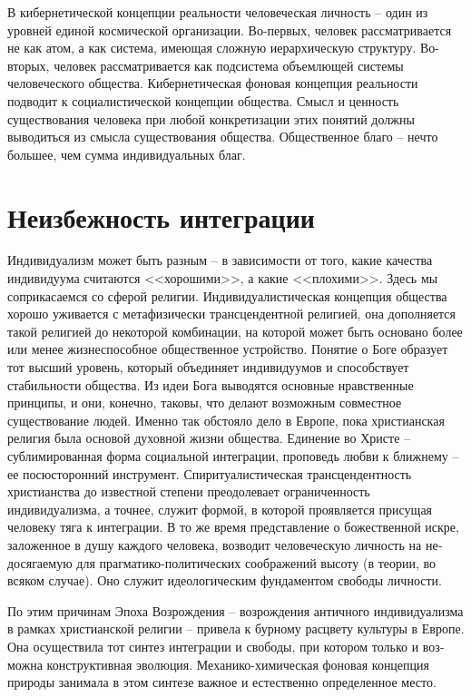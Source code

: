 \documentclass{book}
\begin{document}
В кибернетической концепции реальности человеческая лич­ность -- один из уровней единой космической организации. Во-первых, человек рассматривается не как атом, а как систе­ма, имеющая сложную иерархическую структуру. Во-вторых, человек рассматривается как подсистема объемлющей систе­мы человеческого общества. Кибернетическая фоновая кон­цепция реальности подводит к социалистической концепции общества. Смысл и ценность существования человека при любой конкретизации этих понятий должны выводиться из смысла существования общества. Общественное благо -- нечто большее, чем сумма индивидуальных благ.

\section{Неизбежность интеграции}

Индивидуализм может быть разным -- в зависимости от то­го, какие качества индивидуума 
считаются <<хорошими>>, а ка­кие <<плохими>>. Здесь мы соприкасаемся со сферой 
религии. Индивидуалистическая концепция общества хорошо уживает­ся с метафизически 
трансцендентной религией, она дополняет­ся такой религией до некоторой комбинации, на 
которой может быть основано более или менее жизнеспособное общественное устройство. 
Понятие о Боге образует тот высший уровень, ко­торый объединяет индивидуумов и 
способствует стабильности общества. Из идеи Бога выводятся основные нравственные 
принципы, и они, конечно, таковы, что делают возможным совместное существование 
людей. Именно так обстояло дело в Европе, пока христианская религия была основой 
духовной жизни общества. Единение во Христе -- сублимированная форма социальной 
интеграции, проповедь любви к ближнему -- ее по­сюсторонний инструмент. 
Спиритуалистическая трансцендент­ность христианства до известной степени преодолевает 
ограни­ченность индивидуализма, а точнее, служит 
формой, в которой проявляется присущая человеку тяга к интеграции. В то же время 
представление о божественной искре, заложенное в ду­шу каждого человека, возводит 
человеческую личность на не­досягаемую для прагматико-политических соображений высоту 
(в теории, во всяком случае). Оно служит идеологическим фундаментом свободы личности.

По этим причинам Эпоха Возрождения -- возрождения антич­ного индивидуализма в рамках 
христианской религии -- при­вела к бурному расцвету культуры в Европе. Она осуществила 
тот синтез интеграции и свободы, при котором только и воз­можна конструктивная 
эволюция. Механико-химическая фоно­вая концепция природы занимала в этом синтезе 
важное и ес­тественно определенное место.
\end{document}
